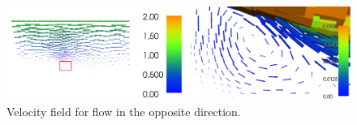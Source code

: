 \documentclass[11pt,a4paper,english]{article}
\numberwithin{equation}{section}
\begin{document}
\vspace{1.5cm}
\begin{figure}[h!]
\begin{center}
  \includegraphics[scale=0.28]{reverse_velstep.png}
  \end{center}
  \caption{Velocity field for flow in the opposite direction.}
\end{figure}
\end{document}
